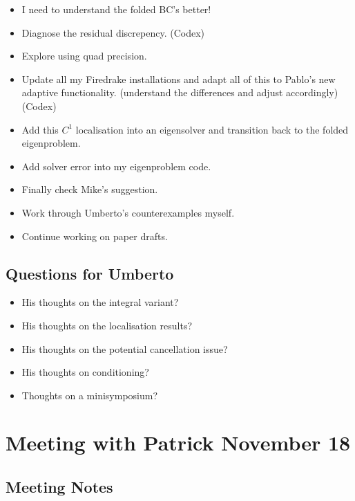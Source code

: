 \documentclass[12pt,a4paper]{article}
\begin{document}
\begin{itemize}
    \item I need to understand the folded BC's better!
    \item Diagnose the residual discrepency. (Codex)
    \item Explore using quad precision. 
    \item Update all my Firedrake installations and adapt all of this to Pablo's new adaptive functionality. (understand the differences and adjust accordingly) (Codex)
    \item Add this $C^1$ localisation into an eigensolver and transition back to the folded eigenproblem. 
    \item Add solver error into my eigenproblem code. 
    \item Finally check Mike's suggestion.
    \item Work through Umberto's counterexamples myself. 
    \item Continue working on paper drafts. 
\end{itemize}

\subsection{Questions for Umberto}

\begin{itemize}
    \item His thoughts on the integral variant?
    \item His thoughts on the localisation results?
    \item His thoughts on the potential cancellation issue? 
    \item His thoughts on conditioning? 
    \item Thoughts on a minisymposium?
\end{itemize}

\newpage

\section{Meeting with Patrick November 18}

\subsection{Meeting Notes}
\end{document}
